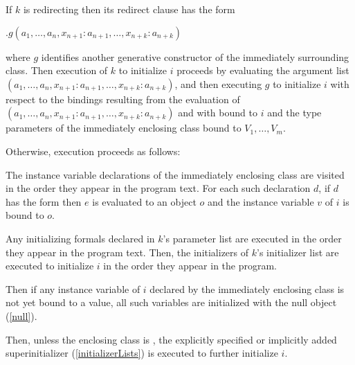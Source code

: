 \documentclass{article}
\begin{document}
\LMHash{}
If $k$ is redirecting then its redirect clause has the form

\THIS{}$.g(a_1, \ldots , a_n, x_{n+1}: a_{n+1}, \ldots , x_{n+k}: a_{n+k})$

where $g$ identifies another generative constructor of the immediately surrounding class.
Then execution of $k$ to initialize $i$ proceeds by evaluating the argument list $(a_1, \ldots , a_n, x_{n+1}: a_{n+1}, \ldots , x_{n+k}: a_{n+k})$, and then executing $g$ to initialize $i$ with respect to the bindings resulting from the evaluation of $(a_1, \ldots , a_n, x_{n+1}: a_{n+1}, \ldots , x_{n+k}: a_{n+k})$ and with \THIS{} bound to $i$ and the type parameters of the immediately enclosing class bound to $V_1, \ldots , V_m$.

\LMHash{}
Otherwise, execution proceeds as follows:

\LMHash{}
The instance variable declarations of the immediately enclosing class are visited in the order they appear in the program text.
For each such declaration $d$, if $d$ has the form 
then $e$ is evaluated to an object $o$
and the instance variable $v$ of $i$ is bound to $o$.

\LMHash{}
Any initializing formals declared in $k$'s parameter list are executed in the order they appear in the program text.
Then, the initializers of $k$'s initializer list are executed to initialize $i$
in the order they appear in the program.


\LMHash{}
Then if any instance variable of $i$ declared by the immediately enclosing class
is not yet bound to a value,
all such variables are initialized with the null object (\ref{null}).

\LMHash{}
Then, unless the enclosing class is , the explicitly specified or
implicitly added superinitializer (\ref{initializerLists}) is executed to
further initialize $i$.

\end{document}
